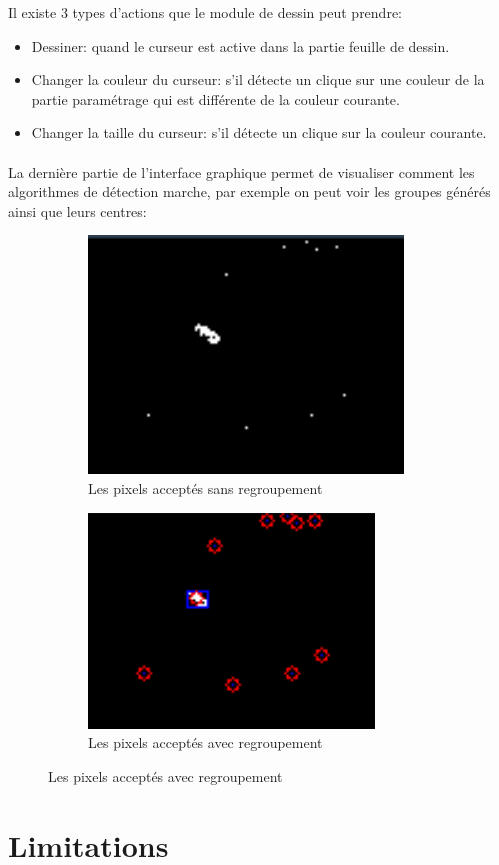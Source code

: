 \documentclass[12pt]{report}
\begin{document}
	Il existe 3 types d’actions que le module de dessin peut prendre:
	\begin{itemize}
		\item Dessiner: quand le curseur est active dans la partie feuille de dessin.
		\item Changer la couleur du curseur: s’il détecte un clique sur une couleur de la partie paramétrage qui est différente de la couleur courante.
		\item Changer la taille du curseur: s’il détecte un clique sur la couleur courante.  
	\end{itemize}
	\paragraph{}
	La dernière partie de l’interface graphique permet de visualiser comment les algorithmes de détection marche, par exemple on peut voir les groupes générés ainsi que leurs centres:
	\begin{figure}[H]
		\centering
		\begin{subfigure}{.5\textwidth}
			\centering
			\includegraphics[width=.4\linewidth]{imgs/notGrouped.png}
			\caption{Les pixels acceptés sans regroupement}
			\label{fig:sub1}
		\end{subfigure}%
		\begin{subfigure}{.5\textwidth}
			\centering
			\includegraphics[width=.4\linewidth]{imgs/grouped.png}
			\caption{Les pixels acceptés avec regroupement}
			\label{fig:sub2}
		\end{subfigure}
		\label{fig:test}
	\end{figure}
	\section{Limitations}
\end{document}
